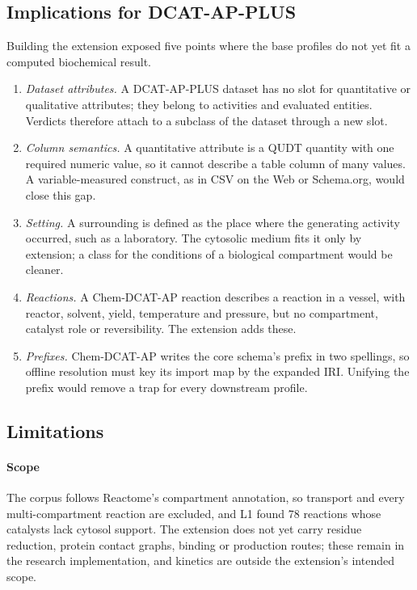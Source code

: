 \documentclass[5p]{elsarticle}
\theoremstyle{definition}
\theoremstyle{plain}
\begin{document}
\subsection{Implications for DCAT-AP-PLUS}
\label{sec:disc-schema}

Building the extension exposed five points where the base profiles do not yet fit a computed biochemical result.
\begin{enumerate}[leftmargin=*,itemsep=1pt,topsep=2pt]
  \item \emph{Dataset attributes.} A DCAT-AP-PLUS dataset has no slot for quantitative or qualitative attributes; they belong to activities and evaluated entities. Verdicts therefore attach to a subclass of the dataset through a new slot.
  \item \emph{Column semantics.} A quantitative attribute is a QUDT quantity with one required numeric value, so it cannot describe a table column of many values. A variable-measured construct, as in CSV on the Web or Schema.org, would close this gap.
  \item \emph{Setting.} A surrounding is defined as the place where the generating activity occurred, such as a laboratory. The cytosolic medium fits it only by extension; a class for the conditions of a biological compartment would be cleaner.
  \item \emph{Reactions.} A Chem-DCAT-AP reaction describes a reaction in a vessel, with reactor, solvent, yield, temperature and pressure, but no compartment, catalyst role or reversibility. The extension adds these.
  \item \emph{Prefixes.} Chem-DCAT-AP writes the core schema's prefix in two spellings, so offline resolution must key its import map by the expanded IRI. Unifying the prefix would remove a trap for every downstream profile.
\end{enumerate}

\subsection{Limitations}
\label{sec:limitations}

\paragraph{Scope}
The corpus follows Reactome's compartment annotation, so transport and every multi-compartment reaction are excluded, and L1 found 78 reactions whose catalysts lack cytosol support.
The extension does not yet carry residue reduction, protein contact graphs, binding or production routes; these remain in the research implementation, and kinetics are outside the extension's intended scope.
\end{document}

